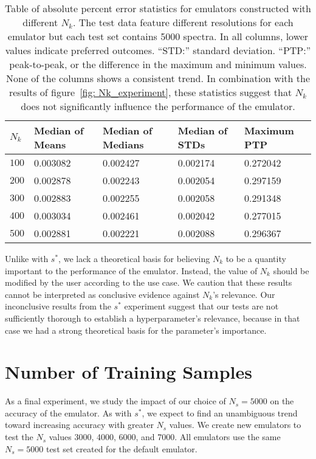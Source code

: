 \begin{table}[ht!]
\centering
\begin{tabular}{l|l|l|l|l}
\hline
$N_k$ & Median of Means & Median of Medians & Median of STDs & Maximum PTP \\ \hline
$100$ & 0.003082 & 0.002427 & 0.002174 & 0.272042 \\
$200$ & 0.002878 & 0.002243 & 0.002054 & 0.297159 \\
$300$ & 0.002883 & 0.002255 & 0.002058 & 0.291348 \\
$400$ & 0.003034 & 0.002461 & 0.002042 & 0.277015 \\
$500$ & 0.002881 & 0.002221 & 0.002088 & 0.296367 \\
\end{tabular}
	\cprotect\caption[$N_k$ Experiment: Percent Error Statistics]{Table of
		absolute percent error statistics
		for emulators constructed with different $N_k$.
		The test data feature different resolutions for each
  		emulator but each test set contains 5000 spectra.
		In all
		columns, lower values indicate preferred outcomes. ``STD:'' standard
		deviation. ``PTP:'' peak-to-peak, or the difference in the maximum
		and minimum values. None of the columns shows a consistent trend.
		In combination with the results of
		figure~\ref{fig: Nk_experiment}, these statistics suggest that
		$N_k$ does not significantly influence the performance of the
		emulator.} 
 \label{tab: Nk_experiment_percerr_stats}
\end{table}

Unlike with $s^*$, we lack a theoretical basis for believing $N_k$ to be a
quantity important to the performance of the emulator. Instead, the value of
$N_k$ should be modified by the user according to the use case. We
caution that these results cannot be interpreted as conclusive evidence
against $N_k$'s relevance. Our inconclusive results from the $s^*$ experiment
suggest that our tests are not sufficiently thorough to establish a
hyperparameter's relevance, because in that case we had a strong theoretical
basis for the parameter's importance.

\section{Number of Training Samples}
\label{sec: num_samples}

As a final experiment, we study the impact of our choice of
$N_s = 5000$ on the accuracy of the emulator.
As with $s^*$, we expect to find an
unambiguous trend toward increasing accuracy with greater $N_s$ values.
We create new emulators to test the $N_s$ values 3000, 4000, 6000, and 7000.
All emulators use the same $N_s = 5000$ test set created for the default
emulator.

